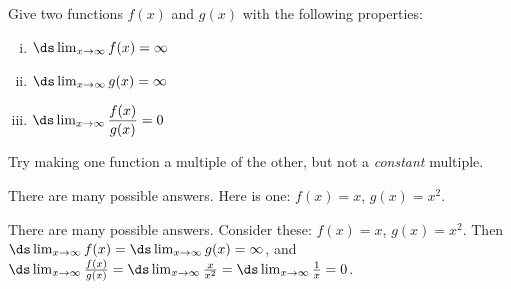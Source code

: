 \begin{Mquestion}Give two functions $f(x)$ and $g(x)$ with the following properties:
\begin{enumerate}[(i)]
\item $\ds\lim_{x \to \infty} f(x)=\infty$
\item $\ds\lim_{x \to \infty} g(x)=\infty$
\item $\ds\lim_{x \to \infty} \dfrac{f(x)}{g(x)}=0$
\end{enumerate}
\end{Mquestion}
\begin{hint} Try making one function a multiple of the other, but not a \emph{constant} multiple.
\end{hint}
\begin{answer} There are many possible answers. Here is one: $f(x)=x$, $g(x)=x^2$.
\end{answer}
\begin{solution} There are many possible answers. Consider these: $f(x)=x$, $g(x)=x^2$.
Then $\ds\lim_{x \rightarrow\infty}f(x)=\ds\lim_{x\to\infty}g(x)=\infty$, and
$\ds\lim_{x\to\infty}\frac{f(x)}{g(x)}=\ds\lim_{x\to\infty}\frac{x}{x^2}=\ds\lim_{x\to\infty}\frac{1}{x}=0$.
\end{solution}




